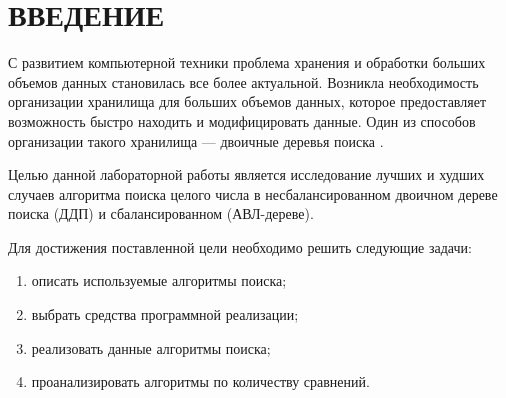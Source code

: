 \chapter*{ВВЕДЕНИЕ}

С развитием компьютерной техники проблема хранения и обработки больших объемов данных становилась все более актуальной.
Возникла необходимость организации хранилища для больших объемов данных, которое предоставляет возможность быстро находить и модифицировать данные. 
Один из способов организации такого хранилища --- двоичные деревья поиска \cite{info_book_bst}. 

Целью данной лабораторной работы является исследование лучших и худших случаев алгоритма поиска целого числа в несбалансированном двоичном дереве поиска (ДДП) и сбалансированном (АВЛ-дереве).

Для достижения поставленной цели необходимо решить следующие задачи:

\begin{enumerate}[label={\arabic*)}]
	\item описать используемые алгоритмы поиска;
	\item выбрать средства программной реализации;
	\item реализовать данные алгоритмы поиска;
	\item проанализировать алгоритмы по количеству сравнений.
\end{enumerate}